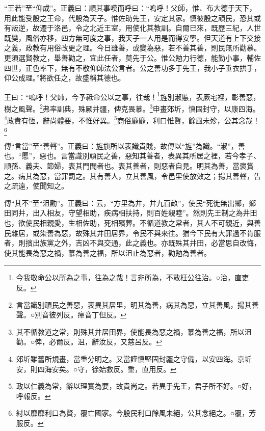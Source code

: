 {\noindent\shu{}\fzkt “王若”至“仰成”。正義曰：順其事嘆而呼曰：“嗚呼！父師，惟、布大德于天下，用此能受殷之王命，代殷為天子。惟佐助先王，安定其家。慎彼殷之頑民，恐其或有叛逆，故遷于洛邑，令之北近王室，用使化其教訓。自爾已來，既歷三紀，人世既變，風俗亦移，四方無可度之事，我天子一人用是而得安寧。但天道有上下交接之義，政教有用俗改更之理。今日雖善，或變為惡，若不善其善，則民無所勸慕。更須選賢教之，舉善勸之，宜此任者，莫先于公。惟公勉力行德，能勤小事，輔佐四世，正色率下，無有不敬仰師法公言者。公之善功多于先王，我小子垂衣拱手，仰公成理。”將欲任之，故盛稱其德也。 \par}

王曰：“嗚呼！父師，今予祗命公以之事，往哉！\footnote{今我敬命公以所為之事，往為之哉！言非所為，不敢枉公往治。○治，直吏反。}旌別淑慝，表厥宅裡，彰善惡，樹之風聲。\footnote{言當識別頑民之善惡，表異其居里，明其為善，病其為惡，立其善風，揚其善聲。○別音彼列反。癉音丁但反。}弗率訓典，殊厥井疆，俾克畏慕。\footnote{其不循教道之常，則殊其井居田界，使能畏為惡之禍，慕為善之福，所以沮勸。○俾，必爾反。沮，辭汝反，又慈呂反。}申畫郊圻，慎固封守，以康四海。\footnote{郊圻雖舊所規畫，當重分明之。又當謹慎堅固封疆之守備，以安四海。京圻安，則四海安矣。○守，徐始救反。重，直用反。}政貴有恆，辭尚體要，不惟好異。\footnote{政以仁義為常，辭以理實為要，故貴尚之。若異于先王，君子所不好。○好，呼報反。}商俗靡靡，利口惟賢，餘風未殄，公其念哉！\footnote{紂以靡靡利口為賢，覆亡國家。今殷民利口餘風未絕，公其念絕之。○覆，芳服反。}


{\noindent\zhuan{}\fzbyks 傳“言當”至“善聲”。正義曰：旌旗所以表識貴賤，故傳以“旌”為識。“淑”，善也。“慝”，惡也。言當識別頑民之善，惡知其善者，表異其所居之裡，若今孝子、順孫、義夫、節婦，表其門閭者也。表其善者，則惡者自見。明其為善，當褒賞之。病其為惡，當罪罰之。其有善人，立其善風，令邑里使放效之；揚其善聲，告之疏遠，使聞知之。 \par}

{\noindent\zhuan{}\fzbyks 傳“其不”至“沮勸”。正義曰：云，“方里為井，井九百畝”，使民“死徙無出鄉，鄉田同井，出入相友，守望相助，疾病相扶持，則百姓親睦”。然則先王制之為井田也，欲使民相親愛，生相佐助，死相殯葬。不循道教之常者，其人不可親近，與善民雜居，或染善為惡，故殊其井田居界，令民不與來往。猶今下民有大罪過不肯服者，則擯出族黨之外，吉凶不與交通，此之義也。亦既殊其井田，必當思自改悔，使其能畏為惡之禍，慕為善之福，所以沮止為惡者，勸勉為善者。 \par}

